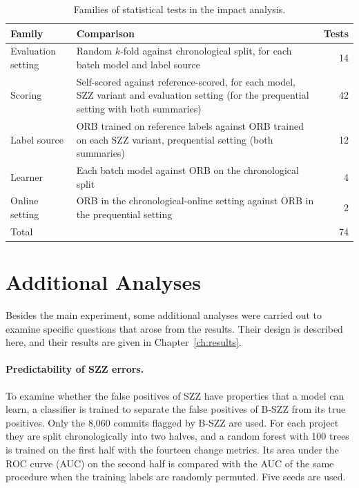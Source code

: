 \documentclass[12pt,a4paper,oneside]{report}
\begin{document}
\begin{table}[htbp]
\centering\small
\caption{Families of statistical tests in the impact analysis.}
\label{tab:families}
\begin{tabularx}{\linewidth}{@{}>{\raggedright\arraybackslash}p{38mm}>{\raggedright\arraybackslash}Xr@{}}
\toprule
Family & Comparison & Tests \\
\midrule
Evaluation setting & Random $k$-fold against chronological split, for each
batch model and label source & 14 \\
Scoring & Self-scored against reference-scored, for each model, SZZ variant
and evaluation setting (for the prequential setting with both summaries) & 42 \\
Label source & ORB trained on reference labels against ORB trained on each
SZZ variant, prequential setting (both summaries) & 12 \\
Learner & Each batch model against ORB on the chronological split & 4 \\
Online setting & ORB in the chronological-online setting against ORB in the
prequential setting & 2 \\
\midrule
Total & & 74 \\
\bottomrule
\end{tabularx}
\end{table}

\section{Additional Analyses}\label{sec:additional-method}

Besides the main experiment, some additional analyses were carried out to
examine specific questions that arose from the results. Their design is
described here, and their results are given in Chapter~\ref{ch:results}.

\paragraph{Predictability of SZZ errors.} To examine whether the false
positives of SZZ have properties that a model can learn, a classifier is
trained to separate the false positives of B-SZZ from its true positives.
Only the 8,060 commits flagged by B-SZZ are used. For each project they are
split chronologically into two halves, and a random forest with 100 trees is
trained on the first half with the fourteen change metrics. Its area under
the ROC curve (AUC) on the second half is compared with the AUC of the same
procedure when the training labels are randomly permuted. Five seeds are
used.
\end{document}
